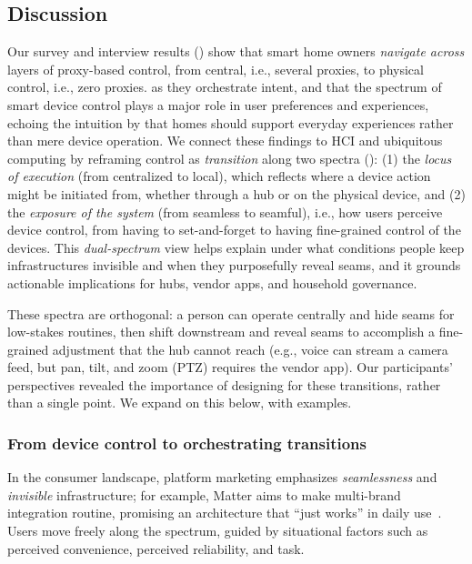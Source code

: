 \subsection{Discussion}
\label{cic:sec:discussion}

Our survey and interview results () show that smart home owners \emph{navigate across} layers of proxy-based control, from central, i.e., several proxies, to physical control, i.e., zero proxies.
as they orchestrate intent, and that the spectrum of smart device control plays a major role in user preferences and experiences, echoing the intuition by \citet{davidoff2006principles, brush2011home} that homes should support everyday experiences rather than mere device operation. We connect these findings to HCI and ubiquitous computing by reframing control as \emph{transition} along two spectra (): (1) the
\emph{locus of execution} (from centralized to local), which reflects where a device action might be initiated from, whether through a hub or on the physical device,
and (2) the \emph{exposure of the system} (from seamless to seamful),  i.e., how users perceive device control, from having to set-and-forget to having fine-grained control of the devices.
This {\it dual-spectrum} view helps explain
under what conditions
people keep infrastructures invisible and when they purposefully reveal seams, and it grounds actionable implications for hubs, vendor apps, and household governance.

These spectra are orthogonal: a person can operate centrally and hide seams for low-stakes routines, then shift downstream and reveal seams to accomplish a fine-grained adjustment that the hub cannot reach (e.g., voice can stream a camera feed, but pan, tilt, and zoom (PTZ) requires the vendor app). Our participants' perspectives revealed the importance of designing for these transitions, rather than a single point. We expand on this below, with examples.

\subsubsection{From device control to orchestrating transitions}
\label{cic:sec:dualControl}

In the consumer landscape, platform marketing emphasizes \emph{seamlessness} and \emph{invisible} infrastructure; for example, Matter aims to make multi-brand integration routine, promising an architecture that ``just works'' in daily use~\cite{matter}. Users move freely along the spectrum, guided by
situational factors such as perceived convenience, perceived reliability, and task.

